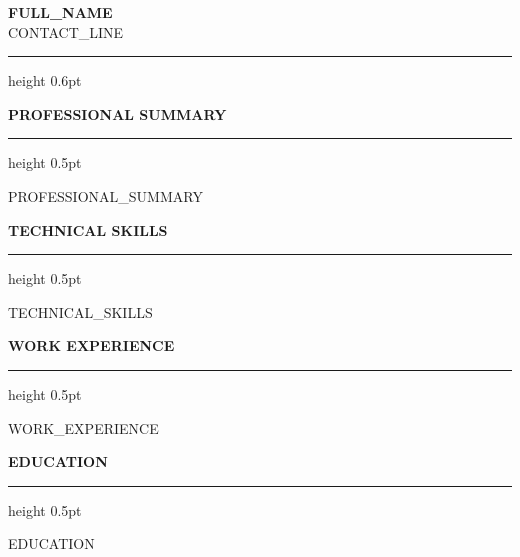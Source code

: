 \documentclass[10pt, letterpaper]{article}
\newcommand{\cvsection}[1]{%
  \vspace{7pt}%
  {\color{cvpurple}\bfseries\normalsize #1}%
  \vspace{1pt}%
  {\color{cvpurple}\hrule height 0.5pt}%
  \vspace{3pt}%
}
\begin{document}
\begin{center}
  {\Large\bfseries {{FULL_NAME}}}\\[4pt]
  {\small\color{cvgray}
    {{CONTACT_LINE}}
  }
\end{center}
\vspace{1pt}
{\color{cvlgray}\hrule height 0.6pt}
\vspace{1pt}

\cvsection{PROFESSIONAL SUMMARY}
{\small
{{PROFESSIONAL_SUMMARY}}
}

\cvsection{TECHNICAL SKILLS}
{{TECHNICAL_SKILLS}}

\cvsection{WORK EXPERIENCE}
{{WORK_EXPERIENCE}}

\cvsection{EDUCATION}
{{EDUCATION}}
\end{document}
